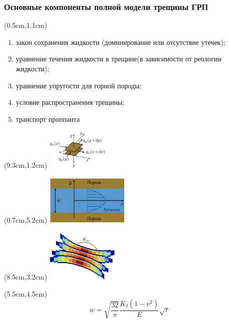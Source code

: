 \documentclass{beamer}
\begin{document}
\begin{frame}
\frametitle{Основные компоненты полной модели трещины ГРП}

\begin{textblock*}{8.8cm}(0.5cm,1.1cm)
\begin{enumerate}[1)]
	\item закон сохранения жидкости (доминирование или отсутствие утечек);
	\item уравнение течения жидкости в трещине\newline(в зависимости от реологии жидкости);
	\item уравнение упругости для горной породы;
	\item условие распространения трещины;
	\item транспорт проппанта
\end{enumerate}
\end{textblock*}

\begin{textblock*}{3cm}(9.3cm,1.2cm)
\includegraphics[width=3cm]{part1_balance.jpg}
\end{textblock*}

\begin{textblock*}{4cm}(0.7cm,5.2cm)
\includegraphics[width=4cm]{part2_flux.jpg}
\end{textblock*}

\begin{textblock*}{3.5cm}(8.5cm,3.2cm)
\includegraphics[width=3.5cm]{part3_elasticity.jpg}
\end{textblock*}


\begin{textblock*}{3cm}(5.5cm,4.5cm)
\tiny
$$
w=\sqrt{\frac{32}{\pi}}\frac{K_{I}\left(1-\nu^2\right)}{E}\sqrt{r}
$$
\normalsize
\end{textblock*}


\end{frame}
\end{document}
